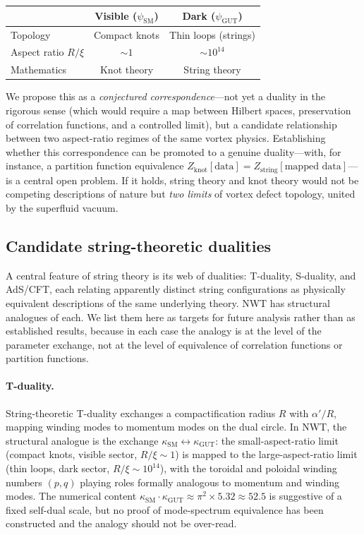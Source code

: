 \documentclass[11pt]{article}
\begin{document}
\begin{center}
\begin{tabular}{@{}lcc@{}}
\toprule
& \textbf{Visible ($\psi_\text{SM}$)} & \textbf{Dark ($\psi_\text{GUT}$)} \\
\midrule
Topology & Compact knots & Thin loops (strings) \\
Aspect ratio $R/\xi$ & $\sim 1$ & $\sim 10^{14}$ \\
Mathematics & Knot theory & String theory \\
\bottomrule
\end{tabular}
\end{center}

We propose this as a \emph{conjectured correspondence}---not yet a duality in the rigorous sense (which would require a map between Hilbert spaces, preservation of correlation functions, and a controlled limit), but a candidate relationship between two aspect-ratio regimes of the same vortex physics.
Establishing whether this correspondence can be promoted to a genuine duality---with, for instance, a partition function equivalence $Z_\text{knot}[\text{data}] = Z_\text{string}[\text{mapped data}]$---is a central open problem.
If it holds, string theory and knot theory would not be competing descriptions of nature but \emph{two limits} of vortex defect topology, united by the superfluid vacuum.

\subsection{Candidate string-theoretic dualities}
\label{sec:candidate-dualities}

A central feature of string theory is its web of dualities: T-duality, S-duality, and AdS/CFT, each relating apparently distinct string configurations as physically equivalent descriptions of the same underlying theory.
NWT has structural analogues of each.
We list them here as targets for future analysis rather than as established results, because in each case the analogy is at the level of the parameter exchange, not at the level of equivalence of correlation functions or partition functions.

\paragraph{T-duality.}
String-theoretic T-duality exchanges a compactification radius $R$ with $\alpha'/R$, mapping winding modes to momentum modes on the dual circle.
In NWT, the structural analogue is the exchange $\kappa_\text{SM} \leftrightarrow \kappa_\text{GUT}$: the small-aspect-ratio limit (compact knots, visible sector, $R/\xi \sim 1$) is mapped to the large-aspect-ratio limit (thin loops, dark sector, $R/\xi \sim 10^{14}$), with the toroidal and poloidal winding numbers $(p, q)$ playing roles formally analogous to momentum and winding modes.
The numerical content $\kappa_\text{SM} \cdot \kappa_\text{GUT} \approx \pi^2 \times 5.32 \approx 52.5$ is suggestive of a fixed self-dual scale, but no proof of mode-spectrum equivalence has been constructed and the analogy should not be over-read.
\end{document}
